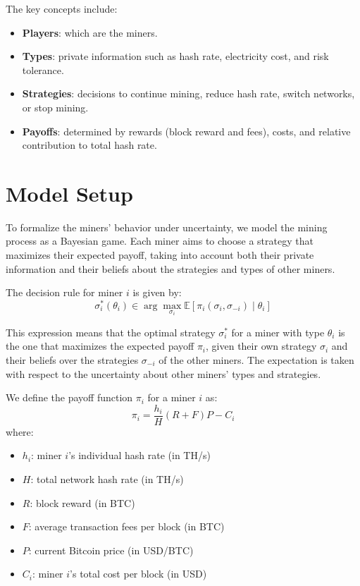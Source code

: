 \documentclass[12pt]{article}
\begin{document}
The key concepts include:
\begin{itemize}
	\item \textbf{Players}: which are the miners.
	\item \textbf{Types}: private information such as hash rate, electricity cost, and risk tolerance.
	\item \textbf{Strategies}: decisions to continue mining, reduce hash rate, switch networks, or stop mining.
	\item \textbf{Payoffs}: determined by rewards (block reward and fees), costs, and relative contribution to total hash rate.
\end{itemize}

\section{Model Setup}
To formalize the miners' behavior under uncertainty, we model the mining process as a Bayesian game. Each miner aims to choose a strategy that maximizes their expected payoff, taking into account both their private information and their beliefs about the strategies and types of other miners.

The decision rule for miner $i$ is given by:
\begin{equation}
	\sigma_i^*(\theta_i) \in \arg\max_{\sigma_i} \mathbb{E}\left[\pi_i(\sigma_i, \sigma_{-i}) \mid \theta_i\right]
\end{equation}

This expression means that the optimal strategy $\sigma_i^*$ for a miner with type $\theta_i$ is the one that maximizes the expected payoff $\pi_i$, given their own strategy $\sigma_i$ and their beliefs over the strategies $\sigma_{-i}$ of the other miners. The expectation is taken with respect to the uncertainty about other miners' types and strategies.

We define the payoff function $\pi_i$ for a miner $i$ as:
\begin{equation}
	\pi_i = \frac{h_i}{H} (R + F)P - C_i
\end{equation}
where:
\begin{itemize}
	\item $h_i$: miner $i$'s individual hash rate (in TH/s)
	\item $H$: total network hash rate (in TH/s)
	\item $R$: block reward (in BTC)
	\item $F$: average transaction fees per block (in BTC)
	\item $P$: current Bitcoin price (in USD/BTC)
	\item $C_i$: miner $i$'s total cost per block (in USD)
\end{itemize}
\end{document}
